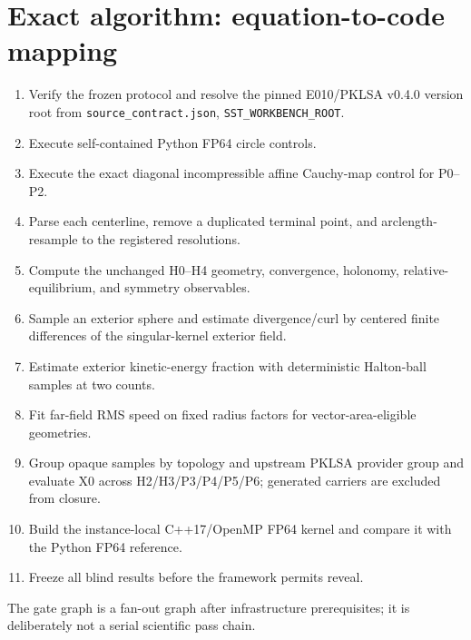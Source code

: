 \documentclass[11pt,a4paper]{article}
\begin{document}

\section{Exact algorithm: equation-to-code mapping}
\begin{enumerate}[label=S\arabic*.]
\item Verify the frozen protocol and resolve the pinned E010/PKLSA v0.4.0 version root from \texttt{source\_contract.json}, \texttt{SST\_WORKBENCH\_ROOT}.
\item Execute self-contained Python FP64 circle controls.
\item Execute the exact diagonal incompressible affine Cauchy-map control for P0--P2.
\item Parse each centerline, remove a duplicated terminal point, and arclength-resample to the registered resolutions.
\item Compute the unchanged H0--H4 geometry, convergence, holonomy, relative-equilibrium, and symmetry observables.
\item Sample an exterior sphere and estimate divergence/curl by centered finite differences of the singular-kernel exterior field.
\item Estimate exterior kinetic-energy fraction with deterministic Halton-ball samples at two counts.
\item Fit far-field RMS speed on fixed radius factors for vector-area-eligible geometries.
\item Group opaque samples by topology and upstream PKLSA provider group and evaluate X0 across H2/H3/P3/P4/P5/P6; generated carriers are excluded from closure.
\item Build the instance-local C++17/OpenMP FP64 kernel and compare it with the Python FP64 reference.
\item Freeze all blind results before the framework permits reveal.
\end{enumerate}
The gate graph is a fan-out graph after infrastructure prerequisites; it is deliberately not a serial scientific pass chain.

\end{document}
